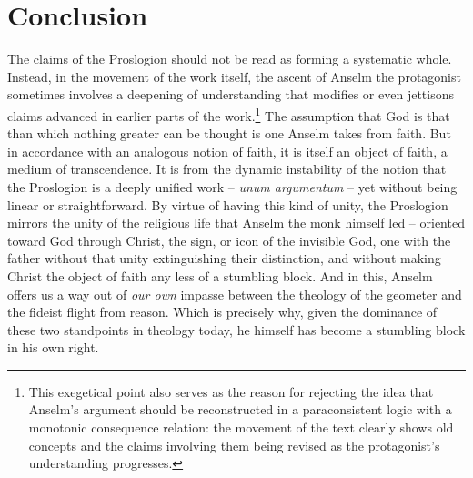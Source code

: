 \documentclass[]{amsart}
\begin{document}
\section{Conclusion}
The claims of the Proslogion should not be read as forming a systematic whole. Instead, in the movement of the work itself, the ascent of Anselm the protagonist sometimes involves a deepening of understanding that modifies or even jettisons claims advanced in earlier parts of the work.\footnote{This exegetical point also serves as the reason for rejecting the idea that Anselm's argument should be reconstructed in a paraconsistent logic with a monotonic consequence relation: the movement of the text clearly shows old concepts and the claims involving them being revised as the protagonist's understanding progresses.} The assumption that God is that than which nothing greater can be thought is one Anselm takes from faith. But in accordance with an analogous notion of faith, it is itself an object of faith, a medium of transcendence. It is from the dynamic instability of the notion that the Proslogion is a deeply unified work – \textit{unum argumentum} – yet without being linear or straightforward. By virtue of having this kind of unity, the Proslogion mirrors the unity of the religious life that Anselm the monk himself led – oriented toward God through Christ, the sign, or icon of the invisible God, one with the father without that unity extinguishing their distinction, and without making Christ the object of faith any less of a stumbling block. And in this, Anselm offers us a way out of \textit{our own} impasse between the theology of the geometer and the fideist flight from reason. Which is precisely why, given the dominance of these two standpoints in theology today, he himself has become a stumbling block in his own right.

\nocite{AlexanderST}
\nocite{RichardDT}
\nocite{Anselm1968}
\nocite{Meditations}
\nocite{CrispinDisp}


\printbibliography
\end{document}
